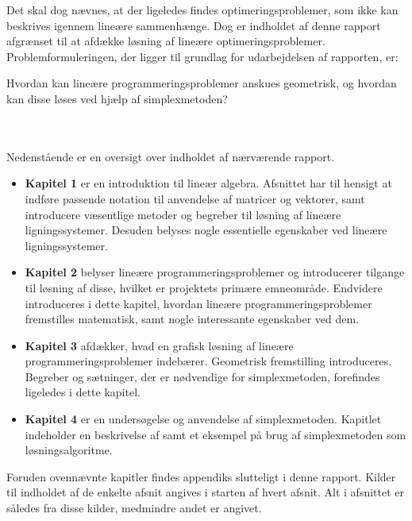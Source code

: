 Det skal dog nævnes, at der ligeledes findes optimeringsproblemer, som ikke kan beskrives igennem lineære sammenhænge. 
Dog er indholdet af denne rapport afgrænset til at afdække løsning af lineære optimeringsproblemer.
Problemformuleringen, der ligger til grundlag for udarbejdelsen af rapporten, er: 
%
\begin{col}{}{}
Hvordan kan lineære programmeringsproblemer anskues geometrisk, og hvordan kan disse løses ved hjælp af simplexmetoden?
\end{col}
% 
\noindent
%
\\\\
Nedenstående er en oversigt over indholdet af nærværende rapport.
%
\begin{itemize}[itemindent=0em]
\item[]\textbf{Kapitel 1} er en introduktion til lineær algebra.
Afsnittet har til hensigt at indføre passende notation til anvendelse af matricer og vektorer, samt introducere væsentlige metoder og begreber til løsning af lineære ligningssystemer. 
Desuden belyses nogle essentielle egenskaber ved lineære ligningssystemer. 
\item[]\textbf{Kapitel 2} belyser lineære programmeringsproblemer og introducerer tilgange til løsning af disse, hvilket er projektets primære emneområde. 
Endvidere introduceres i dette kapitel, hvordan lineære programmeringsproblemer fremstilles matematisk, samt nogle interessante egenskaber ved dem. 
\item[]\textbf{Kapitel 3} afdækker, hvad en grafisk løsning af lineære programmeringsproblemer indebærer. 
Geometrisk fremstilling introduceres. 
Begreber og sætninger, der er nødvendige for simplexmetoden, forefindes ligeledes i dette kapitel. 
\item[]\textbf{Kapitel 4} er en undersøgelse og anvendelse af simplexmetoden. 
Kapitlet indeholder en beskrivelse af samt et eksempel på brug af simplexmetoden som løsningsalgoritme.
\end{itemize}
%
Foruden ovennævnte kapitler findes appendiks slutteligt i denne rapport.
Kilder til indholdet af de enkelte afsnit angives i starten af hvert afsnit. 
Alt i afsnittet er således fra disse kilder, medmindre andet er angivet. 